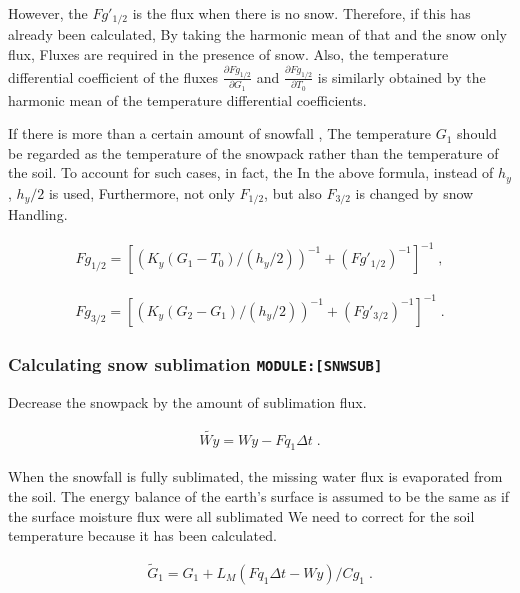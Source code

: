 However, the \(Fg'_{1/2}\) is the flux when there is no snow. Therefore,
if this has already been calculated, By taking the harmonic mean of that
and the snow only flux, Fluxes are required in the presence of snow.
Also, the temperature differential coefficient of the fluxes
\(\frac{\partial Fg_{1/2}}{\partial G_1}\) and
\(\frac{\partial Fg_{1/2}}{\partial T_0}\) is similarly obtained by the
harmonic mean of the temperature differential coefficients.

If there is more than a certain amount of snowfall , The temperature
\(G_1\) should be regarded as the temperature of the snowpack rather
than the temperature of the soil. To account for such cases, in fact,
the In the above formula, instead of \(h_y\), \(h_y/2\) is used,
Furthermore, not only \(F_{1/2}\), but also \(F_{3/2}\) is changed by
snow Handling.

\begin{eqnarray}
  Fg_{1/2} = \left[ \left( K_y (G_1-T_0)/(h_y/2) \right)^{-1} 
                    +  (Fg'_{1/2})^{-1}
                \right]^{-1} \; ,
\end{eqnarray}

\begin{eqnarray}
  Fg_{3/2} = \left[ \left( K_y (G_2-G_1)/(h_y/2) \right)^{-1} 
                    +  (Fg'_{3/2})^{-1}
                \right]^{-1} \; .
\end{eqnarray}

\hypertarget{calculating-snow-sublimation-modulesnwsub}{%
\subsubsection{\texorpdfstring{Calculating snow sublimation
\texttt{MODULE:{[}SNWSUB{]}}}{Calculating snow sublimation MODULE:{[}SNWSUB{]}}}\label{calculating-snow-sublimation-modulesnwsub}}

Decrease the snowpack by the amount of sublimation flux.

\begin{eqnarray}
  \tilde{Wy} = Wy - Fq_1 \Delta t \; .
\end{eqnarray}

When the snowfall is fully sublimated, the missing water flux is
evaporated from the soil. The energy balance of the earth's surface is
assumed to be the same as if the surface moisture flux were all
sublimated We need to correct for the soil temperature because it has
been calculated.

\begin{eqnarray}
  \tilde{G}_1 = G_1 + L_M ( Fq_1 \Delta t - Wy ) / Cg_1 \; .
\end{eqnarray}

